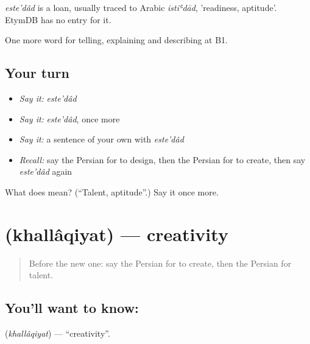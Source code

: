 \begin{cousinweb}
\emph{este'dâd} is a loan, usually traced to Arabic \emph{istiʿdād}, 'readiness, aptitude'. EtymDB has no entry for it.
\end{cousinweb}

\begin{grammarlens}[title={What you've built}]
One more word for telling, explaining and describing at B1.
\end{grammarlens}

\subsection*{Your turn}
\begin{itemize}
\raggedright
  \item \emph{Say it:} \emph{este'dâd}
  \item \emph{Say it:} \emph{este'dâd}, once more
  \item \emph{Say it:} a sentence of your own with \emph{este'dâd}
  \item \emph{Recall:} say the Persian for to design, then the Persian for to create, then say \emph{este'dâd} again
\end{itemize}

\begin{tcolorbox}[breakable,colback=teal!4,colframe=teal!35!black,title={Before you move on}]
What does  mean? (\textquotedblleft{}Talent, aptitude\textquotedblright{}.) Say it once more.
\end{tcolorbox}
\section[\texorpdfstring{\fa{خلاقیت} (khallâqiyat)}{خلاقیت (khallâqiyat)}]{ (khallâqiyat) — creativity}

\label{lesson:FA-C527-khallaqiyat}



\begin{quote}
Before the new one: say the Persian for to create, then the Persian for talent.
\end{quote}

\subsection*{You'll want to know: }
\textbf{} (\emph{khallâqiyat}) — \textquotedblleft{}creativity\textquotedblright{}.

